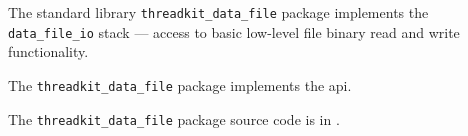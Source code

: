 
The standard library {\tt threadkit\_data\_file} package implements the {\tt data\_file\_io} stack 
 --- access to basic low-level file binary read and write functionality.

The {\tt threadkit\_data\_file} package implements the  api.

The {\tt threadkit\_data\_file} package source code is in .

